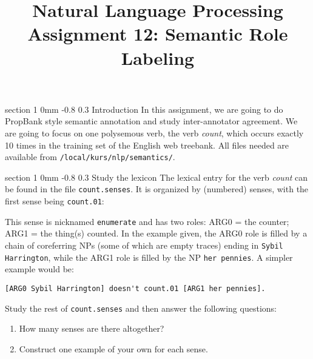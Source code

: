 \documentclass[11pt]{article}
\title{{\LARGE Natural Language Processing}\\[1.5mm]{\large Assignment 12: Semantic Role Labeling}}
\author{}
\date{} %
\makeatletter
\newcommand{\newsec}[2]{\section{#1}\label{sec:#2}\noindent}
\renewcommand{\section}{\@startsection
{section}%
{1}%
{0mm}%
{-0.8\baselineskip}%
{0.3\baselineskip}%
{\bfseries\large}}%
\makeatother
\begin{document}
 

\maketitle
\vspace{-2mm}
\newsec{Introduction}{intro}%
In this assignment, we are going to do PropBank style semantic annotation and study inter-annotator agreement. We are going to focus on one polysemous verb, the verb {\em count}, which occurs exactly 10 times in the 
training set of the English web treebank. All files needed are available from {\tt /local/kurs/nlp/semantics/}.


\newsec{Study the lexicon}{lex}%
The lexical entry for the verb {\em count} can be found in the file {\tt count.senses}. It is organized by 
(numbered) senses, with the first sense being {\tt count.01}:


This sense is nicknamed {\tt enumerate} and has two roles: ARG0 = the counter; ARG1 = the thing(s) counted.
In the example given, the ARG0 role is filled by a chain of coreferring NPs (some of which are empty traces)
ending in {\tt Sybil Harrington}, while the ARG1 role is filled by the NP {\tt her pennies}. A simpler example would be: 
\begin{Verbatim}[fontsize=\small,xleftmargin=\parindent]
[ARG0 Sybil Harrington] doesn't count.01 [ARG1 her pennies].
\end{Verbatim}
Study the rest of {\tt count.senses} and then answer the following questions:
\begin{enumerate}[noitemsep,topsep=0.2cm]
\item How many senses are there altogether?
\item Construct one example of your own for each sense.
\end{enumerate}
\end{document}
